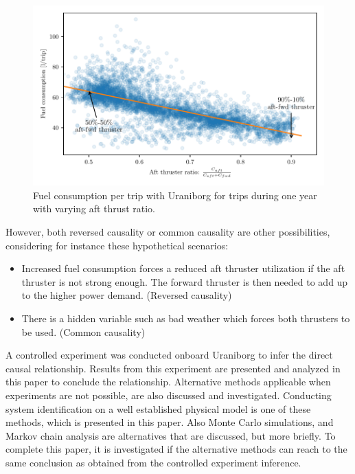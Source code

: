 \documentclass[fleqn,10pt]{olplainarticle}
\begin{document}
\begin{figure}[!htb]
    \centering
    \includegraphics[width=\textwidth]{figures/correlation.pdf}
    \caption{Fuel consumption per trip with Uraniborg for trips during one year with varying aft thrust ratio.}
    \label{fig:fuel_consumption_correlation}
\end{figure}
However, both reversed causality or common causality are other possibilities, considering for instance these hypothetical scenarios:
\begin{itemize}
    \item Increased fuel consumption forces a reduced aft thruster utilization if the aft thruster is not strong enough. The forward thruster is then needed to add up to the higher power demand. (Reversed causality)

    \item There is a hidden variable such as bad weather which forces both thrusters to be used. (Common causality)
\end{itemize}

A controlled experiment was conducted onboard Uraniborg to infer the direct causal relationship. Results from this experiment are presented and analyzed in this paper to conclude the relationship. Alternative methods applicable when experiments are not possible, are also discussed and investigated. Conducting system identification on a well established physical model is one of these methods, which is presented in this paper. Also Monte Carlo simulations, and Markov chain analysis are alternatives that are discussed, but more briefly. To complete this paper, it is investigated if the alternative methods can reach to the same conclusion as obtained from the controlled experiment inference.
\end{document}
